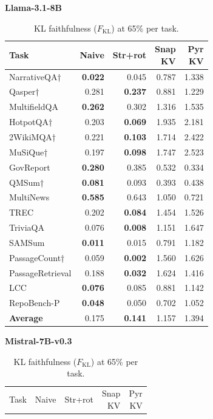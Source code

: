 \documentclass[10pt,letterpaper]{article}
\begin{document}
\begin{table}[H]
\centering
\small
\captionsetup{justification=centering}
\caption{KL faithfulness (\(F_{\text{KL}}\)) at 65\% per task.}
\label{tab:kl55-llama}
\begin{minipage}[t]{0.49\textwidth}
\centering
\textbf{Llama-3.1-8B}\\[0.4em]
\begin{tabular}{@{}lrrrr@{}}
\toprule
Task & Naive & Str+rot & \makecell{Snap\\KV} & \makecell{Pyr\\KV}\\
\midrule
NarrativeQA† & \textbf{0.022} & 0.045 & 0.787 & 1.338\\
Qasper† & 0.281 & \textbf{0.237} & 0.881 & 1.229\\
MultifieldQA & \textbf{0.262} & 0.302 & 1.316 & 1.535\\
HotpotQA† & 0.203 & \textbf{0.069} & 1.935 & 2.181\\
2WikiMQA† & 0.221 & \textbf{0.103} & 1.714 & 2.422\\
MuSiQue† & 0.197 & \textbf{0.098} & 1.747 & 2.523\\
GovReport & \textbf{0.280} & 0.385 & 0.532 & 0.334\\
QMSum† & \textbf{0.081} & 0.093 & 0.393 & 0.438\\
MultiNews & \textbf{0.585} & 0.643 & 1.050 & 0.721\\
TREC & 0.202 & \textbf{0.084} & 1.454 & 1.526\\
TriviaQA & 0.076 & \textbf{0.008} & 1.151 & 1.647\\
SAMSum & \textbf{0.011} & 0.015 & 0.791 & 1.182\\
PassageCount† & 0.059 & \textbf{0.002} & 1.560 & 1.626\\
PassageRetrieval & 0.188 & \textbf{0.032} & 1.624 & 1.416\\
LCC & \textbf{0.076} & 0.085 & 0.881 & 1.142\\
RepoBench-P & \textbf{0.048} & 0.050 & 0.702 & 1.052\\
\midrule
\textbf{Average} & 0.175 & \textbf{0.141} & 1.157 & 1.394\\
\bottomrule
\end{tabular}
\end{minipage}%
\hfill
\begin{minipage}[t]{0.49\textwidth}
\centering
\textbf{Mistral-7B-v0.3}\\[0.4em]
\begin{tabular}{@{}lrrrr@{}}
\toprule
Task & Naive & Str+rot & \makecell{Snap\\KV} & \makecell{Pyr\\KV}\\

\end{tabular}
\end{minipage}
\end{table}
\end{document}
